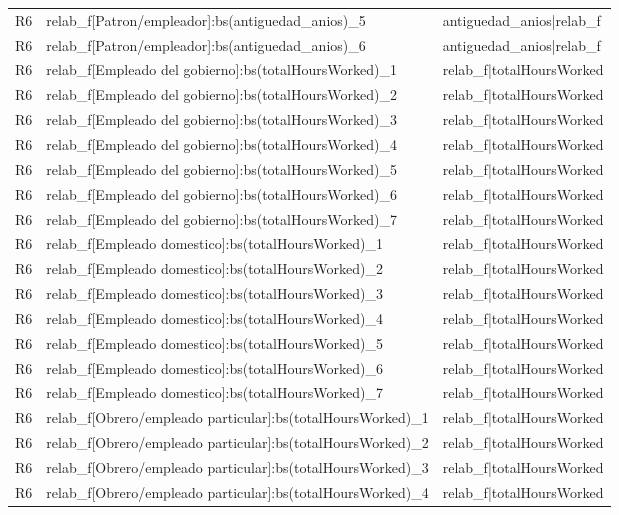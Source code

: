 \begin{longtable}{lll}
R6 & relab\_f[Patron/empleador]:bs(antiguedad\_anios)\_5 & antiguedad\_anios|relab\_f \\
R6 & relab\_f[Patron/empleador]:bs(antiguedad\_anios)\_6 & antiguedad\_anios|relab\_f \\
R6 & relab\_f[Empleado del gobierno]:bs(totalHoursWorked)\_1 & relab\_f|totalHoursWorked \\
R6 & relab\_f[Empleado del gobierno]:bs(totalHoursWorked)\_2 & relab\_f|totalHoursWorked \\
R6 & relab\_f[Empleado del gobierno]:bs(totalHoursWorked)\_3 & relab\_f|totalHoursWorked \\
R6 & relab\_f[Empleado del gobierno]:bs(totalHoursWorked)\_4 & relab\_f|totalHoursWorked \\
R6 & relab\_f[Empleado del gobierno]:bs(totalHoursWorked)\_5 & relab\_f|totalHoursWorked \\
R6 & relab\_f[Empleado del gobierno]:bs(totalHoursWorked)\_6 & relab\_f|totalHoursWorked \\
R6 & relab\_f[Empleado del gobierno]:bs(totalHoursWorked)\_7 & relab\_f|totalHoursWorked \\
R6 & relab\_f[Empleado domestico]:bs(totalHoursWorked)\_1 & relab\_f|totalHoursWorked \\
R6 & relab\_f[Empleado domestico]:bs(totalHoursWorked)\_2 & relab\_f|totalHoursWorked \\
R6 & relab\_f[Empleado domestico]:bs(totalHoursWorked)\_3 & relab\_f|totalHoursWorked \\
R6 & relab\_f[Empleado domestico]:bs(totalHoursWorked)\_4 & relab\_f|totalHoursWorked \\
R6 & relab\_f[Empleado domestico]:bs(totalHoursWorked)\_5 & relab\_f|totalHoursWorked \\
R6 & relab\_f[Empleado domestico]:bs(totalHoursWorked)\_6 & relab\_f|totalHoursWorked \\
R6 & relab\_f[Empleado domestico]:bs(totalHoursWorked)\_7 & relab\_f|totalHoursWorked \\
R6 & relab\_f[Obrero/empleado particular]:bs(totalHoursWorked)\_1 & relab\_f|totalHoursWorked \\
R6 & relab\_f[Obrero/empleado particular]:bs(totalHoursWorked)\_2 & relab\_f|totalHoursWorked \\
R6 & relab\_f[Obrero/empleado particular]:bs(totalHoursWorked)\_3 & relab\_f|totalHoursWorked \\
R6 & relab\_f[Obrero/empleado particular]:bs(totalHoursWorked)\_4 & relab\_f|totalHoursWorked \\

\end{longtable}
